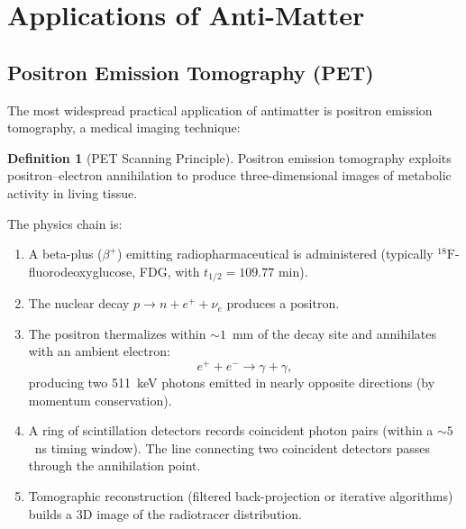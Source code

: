 \documentclass[12pt]{article}
\theoremstyle{definition}
\newtheorem{definition}[theorem]{Definition}
\theoremstyle{remark}
\begin{document}
\section{Applications of Anti-Matter}
\label{sec:applications}

\subsection{Positron Emission Tomography (PET)}

The most widespread practical application of antimatter is positron emission tomography,
a medical imaging technique:

\begin{definition}[PET Scanning Principle]
Positron emission tomography exploits positron--electron annihilation to produce
three-dimensional images of metabolic activity in living tissue.
\end{definition}

The physics chain is:
\begin{enumerate}
    \item A beta-plus ($\beta^+$) emitting radiopharmaceutical is administered
    (typically ${}^{18}\text{F}$-fluorodeoxyglucose, FDG, with $t_{1/2} = 109.77$ min).

    \item The nuclear decay $p \to n + e^+ + \nu_e$ produces a positron.

    \item The positron thermalizes within $\sim 1$~mm of the decay site and
    annihilates with an ambient electron:
    \begin{equation}
    e^+ + e^- \to \gamma + \gamma,
    \end{equation}
    producing two 511~keV photons emitted in nearly opposite directions (by
    momentum conservation).

    \item A ring of scintillation detectors records coincident photon pairs
    (within a $\sim 5$~ns timing window). The line connecting two coincident
    detectors passes through the annihilation point.

    \item Tomographic reconstruction (filtered back-projection or iterative algorithms)
    builds a 3D image of the radiotracer distribution.
\end{enumerate}
\end{document}
